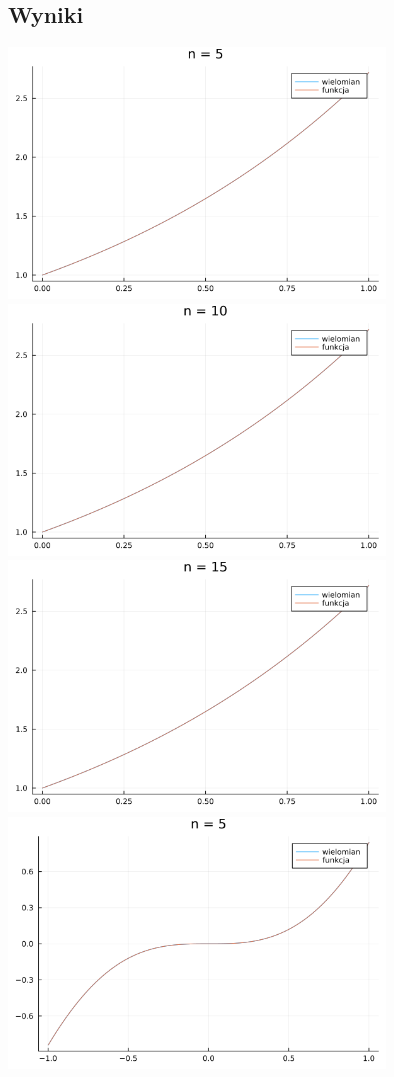 \documentclass{article}
\begin{document}
\begin{center}
    \subsection{Wyniki}
    \includegraphics[width=100mm]{z5f1_5.png}
    \includegraphics[width=100mm]{z5f1_10.png}
    \includegraphics[width=100mm]{z5f1_15.png}
    \includegraphics[width=100mm]{z5f2_5.png}

\end{center}
\end{document}
